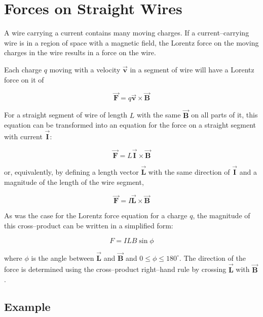 \documentclass{article}
\newcommand{\bfvec}[1]{\vec{\mathbf{#1}}}
\begin{document}
\section{Forces on Straight Wires}

A wire carrying a current contains many moving charges. If a current--carrying wire is in a region of space with a magnetic field, the Lorentz force on the moving charges in the wire results in a force on the wire.

Each charge $q$ moving with a velocity $\bfvec{v}$ in a segment of wire  will have a Lorentz force on it of

\begin{equation}
\bfvec{F} = q\bfvec{v}\times\bfvec{B}
\end{equation}

For a straight segment of wire of length $L$ with the same $\bfvec{B}$ on all parts of it, this equation can be transformed into an equation for the force on a straight segment with current $\bfvec{I}$:

\begin{equation}
\bfvec{F} = L\bfvec{I}\times\bfvec{B}
\end{equation}

or, equivalently, by defining a length vector $\bfvec{L}$ with the same direction of $\bfvec{I}$ and a magnitude of the length of the wire segment,

\begin{equation}
\bfvec{F} = I\bfvec{L}\times\bfvec{B}
\end{equation}

As was the case for the Lorentz force equation for a charge $q$, the magnitude of this cross--product can be written in a simplified form:

\begin{equation}
F=ILB\sin\phi
\end{equation}

where $\phi$ is the angle between $\bfvec{L}$ and $\bfvec{B}$ and $0 \le\phi \le 180^{\circ}$. The direction of the force is determined using the cross--product right--hand rule by crossing $\bfvec{L}$ with $\bfvec{B}$.

\newpage

\subsection{Example}


\end{document}
